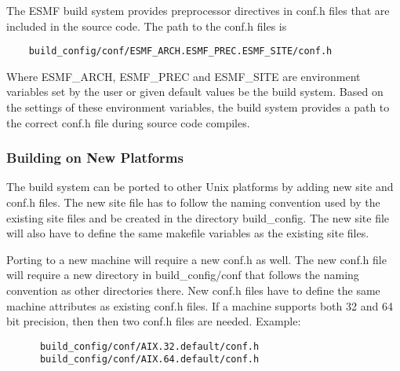 The ESMF build system provides preprocessor directives in conf.h files
that are included in the source code.  The path to the conf.h files is

\begin{verbatim}
    build_config/conf/ESMF_ARCH.ESMF_PREC.ESMF_SITE/conf.h
\end{verbatim}

Where ESMF\_ARCH, ESMF\_PREC and ESMF\_SITE are environment variables 
set by the user or given default values be the build system.  Based on 
the settings of these environment variables, the build system provides
a path to the correct conf.h file during source code compiles.


\subsubsection{Building on New Platforms}

The build system can be ported to other Unix platforms by adding new
site and conf.h files.  The new site file has to follow the naming
convention used by the existing site files and be created in the
directory build\_config.  The new site file will also have to define
the same makefile variables as the existing site files.

Porting to a new machine will require a new conf.h as well. The new
conf.h file will require a new directory in build\_config/conf that
follows the naming convention as other directories there.
New conf.h files have to define the same machine attributes as
existing conf.h files.  If a machine supports both 32 and 64 bit
precision, then then two conf.h files are needed.  Example:

\begin{verbatim}
      build_config/conf/AIX.32.default/conf.h
      build_config/conf/AIX.64.default/conf.h
\end{verbatim}

